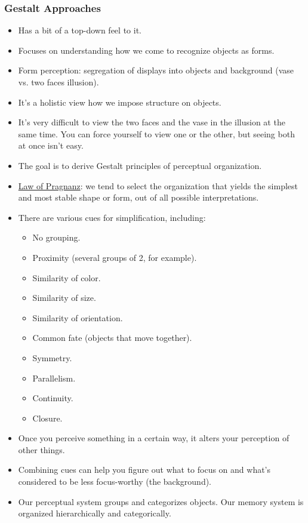 \documentclass[]{article}
\begin{document}
			\subsubsection{Gestalt Approaches}
				\begin{itemize}
					\item Has a bit of a top-down feel to it.
					\item Focuses on understanding how we come to recognize objects as forms.
					\item Form perception: segregation of displays into objects and background (vase vs. two faces illusion).
					\item It's a holistic view \textendash{} how we impose structure on objects.
					\item It's very difficult to view the two faces and the vase in the illusion at the same time. You can force yourself to view one or the other, but seeing both at once isn't easy.
					\item The goal is to derive Gestalt principles of perceptual organization.
					\item \underline{Law of Pragnanz}: we tend to select the organization that yields the simplest and most stable shape or form, out of all possible interpretations.
					\item There are various cues for simplification, including:
						\begin{itemize}
							\item No grouping.
							\item Proximity (several groups of 2, for example).
							\item Similarity of color.
							\item Similarity of size.
							\item Similarity of orientation.
							\item Common fate (objects that move together).
							\item Symmetry.
							\item Parallelism.
							\item Continuity.
							\item Closure.
						\end{itemize}
					\item Once you perceive something in a certain way, it alters your perception of other things.
					\item Combining cues can help you figure out what to focus on and what's considered to be less focus-worthy (the background).
					\item Our perceptual system groups and categorizes objects. Our memory system is organized hierarchically and categorically.

\end{itemize}
\end{document}
